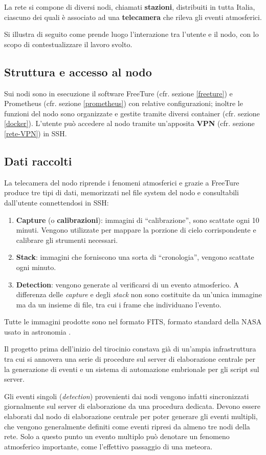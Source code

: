 La rete si compone di diversi nodi, chiamati \textbf{stazioni}, distribuiti in tutta Italia, ciascuno dei quali è associato ad una \textbf{telecamera} che rileva gli eventi atmosferici.

Si illustra di seguito come prende luogo l'interazione tra l'utente e il nodo, con lo scopo di contestualizzare il lavoro svolto.

\subsection{Struttura e accesso al nodo}
Sui nodi sono in esecuzione il software FreeTure (cfr. sezione \ref{freeture}) e Prometheus (cfr. sezione \ref{prometheus}) con relative configurazioni; inoltre le funzioni del nodo sono organizzate e gestite tramite diversi container (cfr. sezione \ref{docker}).
L'utente può accedere al nodo tramite un'apposita \textbf{VPN} (cfr. sezione \ref{rete-VPN}) in SSH.

\subsection{Dati raccolti} \label{dati-raccolti}
La telecamera del nodo riprende i fenomeni atmosferici e grazie a FreeTure produce tre tipi di dati, memorizzati nel file system del nodo e consultabili dall'utente connettendosi in SSH:
\begin{enumerate}
    \item \textbf{Capture} (o \textbf{calibrazioni}): immagini di “calibrazione”, sono scattate ogni 10 minuti. Vengono utilizzate per mappare la porzione di cielo corrispondente e calibrare gli strumenti necessari.
    \item \textbf{Stack}: immagini che forniscono una sorta di “cronologia”, vengono scattate ogni minuto.
    \item \textbf{Detection}: vengono generate al verificarsi di un evento atmosferico. A differenza delle \emph{capture} e degli \emph{stack} non sono costituite da un'unica immagine ma da un insieme di file, tra cui i frame che individuano l'evento.
\end{enumerate}
Tutte le immagini prodotte sono nel formato FITS, formato standard della NASA usato in astronomia \cite{FITS}. 

Il progetto prima dell'inizio del tirocinio constava già di un'ampia infrastruttura tra cui si annovera una serie di procedure sul server di elaborazione centrale per la generazione di eventi e un sistema di automazione embrionale per gli script sul server.

Gli eventi singoli (\emph{detection}) provenienti dai nodi vengono infatti sincronizzati giornalmente sul server di elaborazione da una procedura dedicata. Devono essere elaborati dal nodo di elaborazione centrale per poter generare gli eventi multipli, che vengono generalmente definiti come eventi ripresi da almeno tre nodi della rete. Solo a questo punto un evento multiplo può denotare un fenomeno atmosferico importante, come l'effettivo passaggio di una meteora.